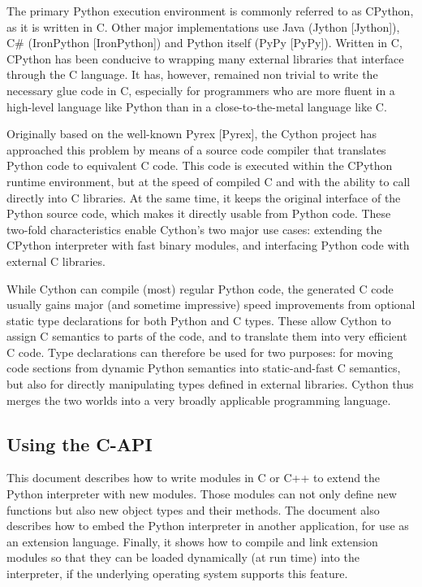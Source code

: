 The primary Python execution environment is commonly referred to as CPython, as it is written in C. Other major implementations use Java (Jython [Jython]), C\# (IronPython [IronPython]) and Python itself (PyPy [PyPy]). Written in C, CPython has been conducive to wrapping many external libraries that interface through the C language. It has, however, remained non trivial to write the necessary glue code in C, especially for programmers who are more fluent in a high-level language like Python than in a close-to-the-metal language like C.

Originally based on the well-known Pyrex [Pyrex], the Cython project has approached this problem by means of a source code compiler that translates Python code to equivalent C code. This code is executed within the CPython runtime environment, but at the speed of compiled C and with the ability to call directly into C libraries. At the same time, it keeps the original interface of the Python source code, which makes it directly usable from Python code. These two-fold characteristics enable Cython’s two major use cases: extending the CPython interpreter with fast binary modules, and interfacing Python code with external C libraries.

While Cython can compile (most) regular Python code, the generated C code usually gains major (and sometime impressive) speed improvements from optional static type declarations for both Python and C types. These allow Cython to assign C semantics to parts of the code, and to translate them into very efficient C code. Type declarations can therefore be used for two purposes: for moving code sections from dynamic Python semantics into static-and-fast C semantics, but also for directly manipulating types defined in external libraries. Cython thus merges the two worlds into a very broadly applicable programming language.





\subsection{Using the C-API}

This document describes how to write modules in C or C++ to extend the Python interpreter with new modules. Those modules can not only define new functions but also new object types and their methods. The document also describes how to embed the Python interpreter in another application, for use as an extension language. Finally, it shows how to compile and link extension modules so that they can be loaded dynamically (at run time) into the interpreter, if the underlying operating system supports this feature.

